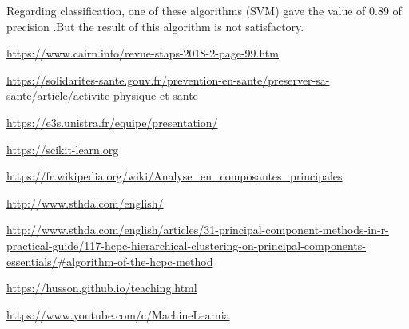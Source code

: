 \documentclass[12pt]{article}
\begin{document}
\noindent Regarding classification, one of these algorithms (SVM) gave the value of 0.89 of precision .But the result of this algorithm is not satisfactory.  


\begin{thebibliography}{9}

\url{https://www.cairn.info/revue-staps-2018-2-page-99.htm}


\url{https://solidarites-sante.gouv.fr/prevention-en-sante/preserver-sa-sante/article/activite-physique-et-sante}

\url{https://e3s.unistra.fr/equipe/presentation/}

\url{https://scikit-learn.org}

\bibitem{}
\url{https://fr.wikipedia.org/wiki/Analyse_en_composantes_principales}


\url{http://www.sthda.com/english/}

\url{http://www.sthda.com/english/articles/31-principal-component-methods-in-r-practical-guide/117-hcpc-hierarchical-clustering-on-principal-components-essentials/#algorithm-of-the-hcpc-method}


\url{https://husson.github.io/teaching.html}


\url{https://www.youtube.com/c/MachineLearnia}



\end{thebibliography}
\end{document}
